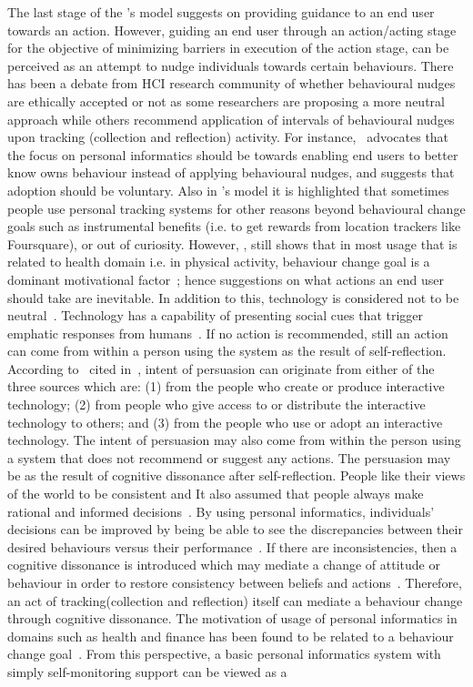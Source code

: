 The last stage of the \cite{li2010stage}'s model suggests on providing guidance to an end user towards an action. However, guiding an end user through an action/acting stage for the objective of minimizing barriers in execution of the action stage, can be perceived as an attempt to nudge individuals towards certain behaviours. There has been a debate from HCI research community of whether behavioural nudges are ethically accepted or not as some researchers are proposing a more neutral approach while others recommend application of intervals of behavioural nudges upon tracking (collection and reflection) activity.  For instance,~\cite{munson2012mindfulness} advocates that the focus on personal informatics  should be towards enabling end users to better know owns behaviour instead of applying behavioural nudges, and suggests that adoption should be voluntary. Also in \cite{epstein2015lived}'s model it is highlighted that sometimes people use personal tracking systems for other reasons beyond behavioural change goals such as instrumental benefits (i.e. to get rewards from location trackers like Foursquare), or out of curiosity. However, \cite{epstein2015lived}, still  shows that in most usage that is related to health domain i.e. in physical activity, behaviour change goal is a dominant motivational factor~\citep{epstein2015lived}; hence suggestions on what actions an end user should take are inevitable. In addition to this, technology is considered not to be neutral~\citep{Oinas-kukkonen:psd}. Technology has a capability of presenting social cues that trigger emphatic responses from humans~\citep{foggpersuasivebook}. If no action is recommended, still an action can come from within a person using the system as the result of self-reflection. According to~\cite{fogg1998persuasive} cited in~\cite{Oinas-kukkonen:psd}, intent of persuasion can originate from either of the three sources which are: (1) from the people who create or produce interactive technology; (2) from people who give access to or distribute the interactive technology to others; and (3) from the people who use or adopt an interactive technology. The intent of persuasion may also come from within the person using a system that does not recommend or suggest any actions. The persuasion may be as the result of cognitive dissonance after self-reflection. People like their views of the world to be consistent and It also assumed that people always make rational and informed decisions~\citep{Oinas-kukkonen:psd}. By using personal informatics, individuals' decisions can be improved by being be able to see the discrepancies between their desired behaviours versus their performance~\citep{comber2013designing}. If there are inconsistencies, then a cognitive dissonance is introduced which may mediate a change of attitude or behaviour in order to restore consistency between beliefs and actions~\citep{Oinas-kukkonen:psd}. Therefore, an act of tracking(collection and reflection) itself can mediate a behaviour change through cognitive dissonance. The motivation of usage of personal informatics in domains such as health and finance has been found to be related to a behaviour change goal~\citep{epstein2015lived}. From this perspective, a basic personal informatics system with simply self-monitoring support can be viewed as a 